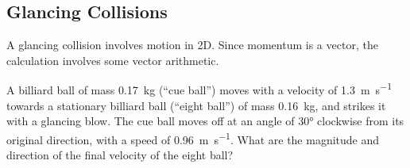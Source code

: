 

\subsection{Glancing Collisions}
A glancing collision involves motion in 2D. Since momentum is a vector, the
calculation involves some vector arithmetic.
  
\begin{example}
  \label{eg:billiard}
  A billiard ball of mass \SI{.17}{\kilo\gram} (``cue ball'') moves with a
  velocity of \SI{1.3}{\metre\per\second} towards a stationary billiard ball
  (``eight ball'') of mass \SI{.16}{\kilo\gram}, and strikes it with a
  glancing blow. The cue ball moves off at an angle of \ang{30} clockwise
  from its original direction, with a speed of \SI{.96}{\metre\per\second}.
  What are the magnitude and direction of the final velocity of the eight ball?
  \begin{center}
  \end{center}
  

\end{example}
